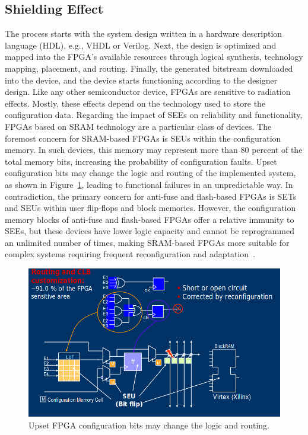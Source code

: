 \subsection{Shielding Effect}

The process starts with the system design written
in a hardware description language (HDL), e.g., VHDL or Verilog. Next, the design is optimized and mapped into the FPGA’s available resources through logical synthesis,
technology mapping, placement, and routing. Finally, the generated bitstream downloaded into the device, and the device starts functioning according to the designer design.
Like any other semiconductor device, FPGAs are sensitive to radiation effects.
Mostly, these effects depend on the technology used to store the configuration data.
Regarding the impact of SEEs on reliability and functionality, FPGAs based on SRAM
technology are a particular class of devices. The foremost concern for SRAM-based FPGAs is
SEUs within the configuration memory. In such devices, this memory may represent more
than 80 percent of the total memory bits, increasing the probability of configuration faults.
Upset configuration bits may change the logic and routing of the implemented system, as
shown in Figure~\ref{fig:seu}, leading to functional failures in an unpredictable way. In contradiction, the primary concern for anti-fuse and flash-based FPGAs is SETs and SEUs within user flip-flops
and block memories. However, the configuration memory blocks of anti-fuse and flash-based
FPGAs offer a relative immunity to SEEs, but these devices have lower logic capacity and
cannot be reprogrammed an unlimited number of times, making SRAM-based FPGAs more
suitable for complex systems requiring frequent reconfiguration and adaptation~\cite{quinn2015validation, violante2004simulation}.

\begin{figure}
 \centering
  \captionsetup{justification=centering}    
   \includegraphics[scale=0.4]{figures/img/seu.png}
   \caption{Upset FPGA configuration bits may change the logic and routing.}
\label{fig:seu}
\end{figure}



